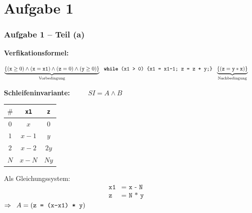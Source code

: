 \documentclass{beamer}
\newcommand*\head{\rowfont{\bfseries}}
\renewcommand{\emph}[1]{\textbf{#1}}
\begin{document}
\section{Aufgabe 1}

\begin{frame} \frametitle{Aufgabe 1 -- Teil (a)}
	
	\textbf{Verfikationsformel:}
	\begin{tiny}
		\begin{equation*}
			\underbrace{\{ (\texttt{x} \ge 0) \land (\texttt{x} = \texttt{x1}) \land (\texttt{z}=0) \land (\texttt{y} \ge 0) \}}_{\text{Vorbedingung}} \ \ \texttt{\emph{while} (\texttt{x1} > 0) \{\texttt{x1 = x1-1}; \texttt{z} = \texttt{z} + \texttt{y};\}} \ \ \underbrace{\{(\texttt{z} = \texttt{y} * \texttt{x})\}}_{\text{Nachbedingung}}
		\end{equation*}
	\end{tiny}
	
	
	\pause
	
	\textbf{Schleifeninvariante:} $\qquad$ $SI = A \land B$ \pause
	
	\begin{minipage}{\dimexpr0.5\linewidth-\fboxrule-\fboxsep}
		\begin{center}
			\begin{tabu}{ccc}
				\toprule
				\head $\#$ & \texttt{x1} & \texttt{z} \\
				\midrule \midrule
				$0$	 & $x$   & $0$  \\
				$1$  & $x-1$ & $y$  \\
				$2$  & $x-2$ & $2y$ \\
				$N$  & $x-N$ & $Ny$ \\
				\bottomrule
			\end{tabu}
		\end{center}
	\end{minipage}
	\begin{minipage}{\dimexpr0.5\linewidth-\fboxrule-\fboxsep}
		Als Gleichungssystem:
		\begin{equation*}
			\begin{array}{rl}
			\texttt{x1} &\texttt{= x - N} \\ \texttt{z} &\texttt{= N * y}
			\end{array}
		\end{equation*}
		$\Rightarrow \enskip A = (\texttt{z = (x-x1) * y})$		
	\end{minipage}
\end{frame}
\end{document}
